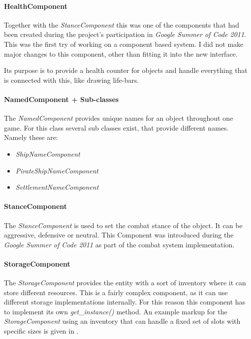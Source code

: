 \paragraph{HealthComponent}
Together with the \textit{StanceComponent} this was one of the components that had been created during the project's
participation in \textit{Google Summer of Code 2011}. This was the first try of working on a component based system. I
did not make major changes to this component, other than fitting it into the new interface.

Its purpose is to provide a health counter for objects and handle everything that is connected with this, like drawing
life-bars.

\paragraph{NamedComponent + Sub-classes}
The \textit{NamedComponent} provides unique names for an object throughout one game. For this class several sub classes
exist, that provide different names. Namely these are:
\begin{itemize}
    \item \textit{ShipNameComponent}
    \item \textit{PirateShipNameComponent}
    \item \textit{SettlementNameComponent}
\end{itemize}

\paragraph{StanceComponent}
The \textit{StanceComponent} is used to set the combat stance of the object. It can be aggressive, defensive or neutral.
This Component was introduced during the \textit{Google Summer of Code 2011} as part of the combat system
implementation.

\paragraph{StorageComponent}
The \textit{StorageComponent} provides the entity with a sort of inventory where it can store different resources. This
is a fairly complex component, as it can use different storage implementations internally. For this reason this
component has to implement its own \textit{get\_instance()} method. An example markup for the \textit{StorageComponent}
using an inventory that can handle a fixed set of slots with specific sizes is given in .

